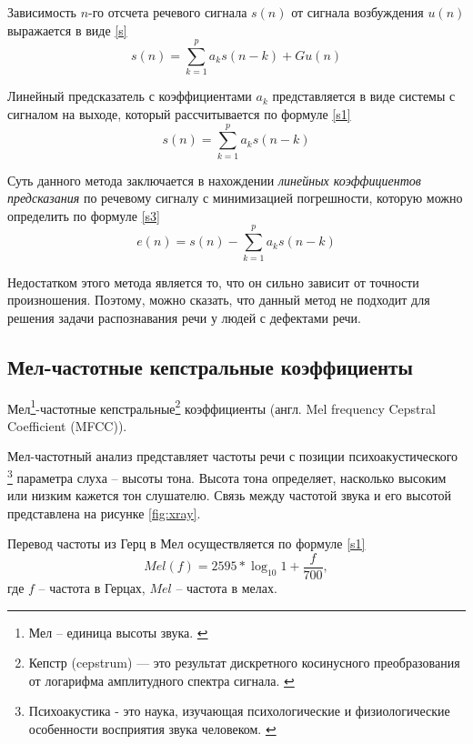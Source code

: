 Зависимость $n$-го отсчета речевого сигнала $s(n)$ от сигнала возбуждения $u(n)$ выражается в виде \eqref{s}
\begin{equation}
\label{s}
s(n) = \sum_{k = 1}^{p} a_k s(n - k) + G u(n)
\end{equation}

Линейный предсказатель с коэффициентами $a_k$ представляется в виде системы с сигналом на выходе, который рассчитывается по формуле \eqref{s1}
\begin{equation}
	\label{s1}
	s(n) = \sum_{k = 1}^{p} a_k s(n - k)
\end{equation}

Суть данного метода заключается в нахождении \textit{линейных коэффициентов предсказания} по речевому сигналу с минимизацией погрешности, которую можно определить по формуле \eqref{s3}
\begin{equation}
	\label{s3}
	e(n) = s(n) - \sum_{k = 1}^{p} a_k s(n - k)
\end{equation}

Недостатком этого метода является то, что он сильно зависит от точности произношения. Поэтому, можно сказать, что данный метод не подходит для решения задачи распознавания речи у людей с дефектами речи.

\subsection{Мел-частотные кепстральные коэффициенты} \label{1}
Мел\footnote{Мел -- единица высоты звука. \cite{kepstr}}-частотные кепстральные\footnote{Кепстр (cepstrum) — это результат дискретного косинусного преобразования от логарифма амплитудного спектра сигнала. \cite{kepstr}} коэффициенты (англ. Mel frequency \newline Cepstral Coefficient (MFCC)).

Мел-частотный анализ представляет частоты речи с позиции психоакустического \footnote{Психоакустика - это наука, изучающая психологические и физиологические особенности восприятия звука человеком. \cite{psih}} параметра слуха – высоты тона. Высота тона определяет, насколько высоким или низким кажется тон слушателю. Связь между частотой звука и его высотой представлена на рисунке \ref{fig:xray}. \cite{methodisb} \cite{methodisb2}

Перевод частоты из Герц в Мел осуществляется по формуле  \eqref{s1}
\begin{equation}
	\label{s1}
	Mel(f) = 2595 * \log_{10}{1 + \frac{f}{700}},
\end{equation}
где $f$ -- частота в Герцах, $Mel$ -- частота в мелах.

